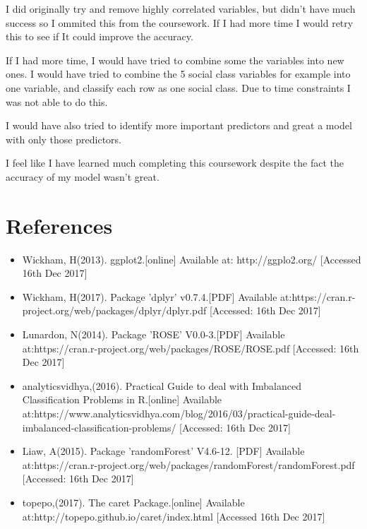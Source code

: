 \documentclass{article}\usepackage[]{graphicx}\usepackage[]{color}
\begin{document}
I did originally try and remove highly correlated variables, but didn't have much success so I ommited this from the coursework. If I had more time I would retry this to see if It could improve the accuracy.

If I had more time, I would have tried to combine some the variables into new ones. I would have tried to combine the 5 social class variables for example into one variable, and classify each row as one social class. Due to time constraints I was not able to do this. 

I would have also tried to identify more important predictors and great a model with only those predictors. 

I feel like I have learned much completing this coursework despite the fact the accuracy of my model wasn't great. 
\section{References}
\begin{itemize}
  \item Wickham, H(2013). ggplot2.[online] Available at: http://ggplo2.org/ [Accessed 16th Dec 2017]  
  \item Wickham, H(2017). Package 'dplyr' v0.7.4.[PDF] Available at:https://cran.r-project.org/web/packages/dplyr/dplyr.pdf [Accessed: 16th Dec 2017]
  \item Lunardon, N(2014). Package 'ROSE' V0.0-3.[PDF] Available at:https://cran.r-project.org/web/packages/ROSE/ROSE.pdf [Accessed: 16th Dec 2017]
  \item analyticsvidhya,(2016). Practical Guide to deal with Imbalanced Classification Problems in R.[online] Available at:https://www.analyticsvidhya.com/blog/2016/03/practical-guide-deal-imbalanced-classification-problems/ [Accessed: 16th Dec 2017]
  \item Liaw, A(2015). Package 'randomForest' V4.6-12. [PDF] Available at:https://cran.r-project.org/web/packages/randomForest/randomForest.pdf [Accessed: 16th Dec 2017]
  \item topepo,(2017). The caret Package.[online] Available at:http://topepo.github.io/caret/index.html [Accessed 16th Dec 2017]
\end{itemize}
\end{document}
